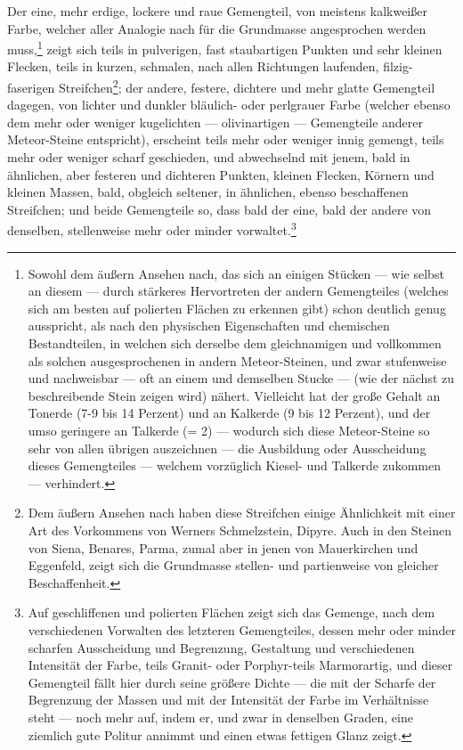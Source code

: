 \documentclass[a4paper, 11pt, oneside, german]{article}
\begin{document}
Der eine, mehr erdige, lockere und raue Gemengteil, von meistens kalkweißer Farbe, welcher aller Analogie nach für die Grundmasse angesprochen werden muss,\footnote{Sowohl dem äußern Ansehen nach, das sich an einigen Stücken --- wie selbst an diesem --- durch stärkeres Hervortreten der andern Gemengteiles (welches sich am besten auf polierten Flächen zu erkennen gibt) schon deutlich genug ausspricht, als nach den physischen Eigenschaften und chemischen Bestandteilen, in welchen sich derselbe dem gleichnamigen und vollkommen als solchen ausgesprochenen in andern Meteor-Steinen, und zwar stufenweise und nachweisbar --- oft an einem und demselben Stucke --- (wie der nächst zu beschreibende Stein zeigen wird) nähert. Vielleicht hat der große Gehalt an Tonerde (7-9 bis 14 Perzent) und an Kalkerde (9 bis 12 Perzent), und der umso geringere an Talkerde (= 2) --- wodurch sich diese Meteor-Steine so sehr von allen übrigen auszeichnen --- die Ausbildung oder Ausscheidung dieses Gemengteiles --- welchem vorzüglich Kiesel- und Talkerde zukommen --- verhindert.} zeigt sich teils in pulverigen, fast staubartigen Punkten und sehr kleinen Flecken, teils in kurzen, schmalen, nach allen Richtungen laufenden, filzig-faserigen Streifchen\footnote{Dem äußern Ansehen nach haben diese Streifchen einige Ähnlichkeit mit einer Art des Vorkommens von Werners Schmelzstein, Dipyre. Auch in den Steinen von Siena, Benares, Parma, zumal aber in jenen von Mauerkirchen und Eggenfeld, zeigt sich die Grundmasse stellen- und partienweise von gleicher Beschaffenheit.}; der andere, festere, dichtere und mehr glatte Gemengteil dagegen, von lichter und dunkler bläulich- oder perlgrauer Farbe (welcher ebenso dem mehr oder weniger kugelichten --- olivinartigen --- Gemengteile anderer Meteor-Steine entspricht), erscheint teils mehr oder weniger innig gemengt, teils mehr oder weniger scharf geschieden, und abwechselnd mit jenem, bald in ähnlichen, aber festeren und dichteren Punkten, kleinen Flecken, Körnern und kleinen Massen, bald, obgleich seltener, in ähnlichen, ebenso beschaffenen Streifchen; und beide Gemengteile so, dass bald der eine, bald der andere von denselben, stellenweise mehr oder minder vorwaltet.\footnote{Auf geschliffenen und polierten Flächen zeigt sich das Gemenge, nach dem verschiedenen Vorwalten des letzteren Gemengteiles, dessen mehr oder minder scharfen Ausscheidung und Begrenzung, Gestaltung und verschiedenen Intensität der Farbe, teils Granit- oder Porphyr-teils Marmorartig, und dieser Gemengteil fällt hier durch seine größere Dichte --- die mit der Scharfe der Begrenzung der Massen und mit der Intensität der Farbe im Verhältnisse steht --- noch mehr auf, indem er, und zwar in denselben Graden, eine ziemlich gute Politur annimmt und einen etwas fettigen Glanz zeigt.}
\end{document}
